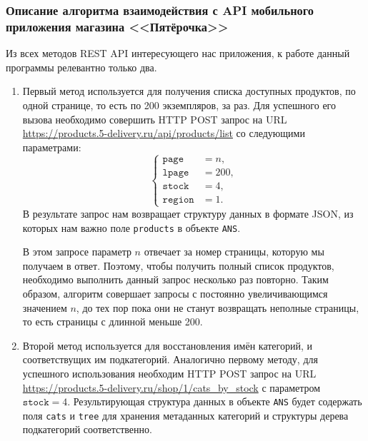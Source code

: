 \documentclass[a4paper,12pt]{article}
\begin{document}
  \subsubsection{Описание алгоритма взаимодействия с API мобильного приложения магазина <<Пятёрочка>>}
  Из всех методов REST API интересующего нас приложения, к работе данный программы релевантно только два.
  \begin{enumerate}
    \item Первый метод используется для получения списка доступных продуктов, по одной странице, то есть по 200 экземпляров, за раз.
      Для успешного его вызова необходимо совершить HTTP POST запрос на URL \url{https://products.5-delivery.ru/api/products/list}
      со следующими параметрами:
        $$\begin{cases}
          \texttt{page} &= n, \\
          \texttt{lpage} &= 200, \\
          \texttt{stock} &= 4, \\
          \texttt{region} &= 1 .
        \end{cases}$$
      В результате запрос нам возвращает структуру данных в формате JSON,
      из которых нам важно поле \texttt{products} в объекте \texttt{ANS}.

      В этом запросе параметр $n$ отвечает за номер страницы, которую мы получаем в ответ.
      Поэтому, чтобы получить полный список продуктов, необходимо выполнить данный запрос несколько раз повторно.
      Таким образом, алгоритм совершает запросы с постоянно увеличивающимся значением $n$,
      до тех пор пока они не станут возвращать неполные страницы, то есть страницы с длинной меньше 200.

    \item Второй метод используется для восстановления имён категорий, и соответствущих им подкатегорий.
      Аналогично первому методу, для успешного использования необходим HTTP POST запрос на URL \url{https://products.5-delivery.ru/shop/1/cats_by_stock} с параметром $\texttt{stock} = 4$.
      Результирующая структура данных в объекте \texttt{ANS} будет содержать поля \texttt{cats} и \texttt{tree}
      для хранения метаданных категорий и структуры дерева подкатегорий соответственно.
  \end{enumerate}
\end{document}
